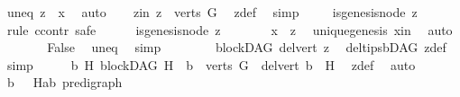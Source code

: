 \begin{isabellebody}
\ uneq{\isacharcolon}{\kern0pt}\ {\isachardoublequoteopen}z\ {\isasymnoteq}\ x{\isachardoublequoteclose}\ \isamarkupfalse%
\ auto\isanewline
\ \ \isamarkupfalse%
\ z{\isacharunderscore}{\kern0pt}in{\isacharcolon}{\kern0pt}\ {\isachardoublequoteopen}z\ {\isasymin}\ verts\ G{\isachardoublequoteclose}\ \isamarkupfalse%
\ z{\isacharunderscore}{\kern0pt}def\ \isamarkupfalse%
\ simp\isanewline
\ \ \isamarkupfalse%
\ {\isachardoublequoteopen}{\isasymnot}\ is{\isacharunderscore}{\kern0pt}genesis{\isacharunderscore}{\kern0pt}node\ z{\isachardoublequoteclose}\isanewline
\ \ \isamarkupfalse%
\ {\isacharparenleft}{\kern0pt}rule\ ccontr{\isacharcomma}{\kern0pt}\ safe{\isacharparenright}{\kern0pt}\isanewline
\ \ \ \ \isamarkupfalse%
\ {\isachardoublequoteopen}is{\isacharunderscore}{\kern0pt}genesis{\isacharunderscore}{\kern0pt}node\ z{\isachardoublequoteclose}\isanewline
\ \ \ \ \isamarkupfalse%
\ \isamarkupfalse%
\ {\isachardoublequoteopen}x\ {\isacharequal}{\kern0pt}\ z{\isachardoublequoteclose}\ \isamarkupfalse%
\ unique{\isacharunderscore}{\kern0pt}genesis\ x{\isacharunderscore}{\kern0pt}in\ \isamarkupfalse%
\ auto\isanewline
\ \ \ \ \isamarkupfalse%
\ \isamarkupfalse%
\ False\ \isamarkupfalse%
\ uneq\ \isamarkupfalse%
\ simp\isanewline
\ \ \isamarkupfalse%
\isanewline
\ \ \isamarkupfalse%
\ \isamarkupfalse%
\ {\isachardoublequoteopen}blockDAG\ {\isacharparenleft}{\kern0pt}del{\isacharunderscore}{\kern0pt}vert\ z{\isacharparenright}{\kern0pt}{\isachardoublequoteclose}\ \isamarkupfalse%
\ del{\isacharunderscore}{\kern0pt}tips{\isacharunderscore}{\kern0pt}bDAG\ z{\isacharunderscore}{\kern0pt}def\ \isamarkupfalse%
\ simp\isanewline
\ \ \isamarkupfalse%
\ \isamarkupfalse%
\ {\isachardoublequoteopen}{\isacharparenleft}{\kern0pt}{\isasymexists}b\ H{\isachardot}{\kern0pt}\ blockDAG\ H\ {\isasymand}\ b\ {\isasymin}\ verts\ G\ {\isasymand}\ del{\isacharunderscore}{\kern0pt}vert\ b\ {\isacharequal}{\kern0pt}\ H{\isacharparenright}{\kern0pt}{\isachardoublequoteclose}\ \isamarkupfalse%
\ z{\isacharunderscore}{\kern0pt}def\ \isamarkupfalse%
\ auto\isanewline
{}\isamarkupfalse%
\ \isanewline
\ \ \isamarkupfalse%
\ b\ \ \ H{\isacharcolon}{\kern0pt}{\isacharcolon}{\kern0pt}{\isachardoublequoteopen}{\isacharparenleft}{\kern0pt}{\isacharprime}{\kern0pt}a{\isacharcomma}{\kern0pt}{\isacharprime}{\kern0pt}b{\isacharparenright}{\kern0pt}\ pre{\isacharunderscore}{\kern0pt}digraph{\isachardoublequoteclose}\isanewline

\end{isabellebody}
